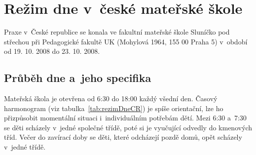 

\section{Režim dne v~české mateřské škole}

		Praxe v~České republice se konala ve fakultní mateřské škole Sluníčko pod střechou při Pedagogické fakultě UK (Mohylová 1964, 155 00 Praha 5) v~období od 19. 10. 2008 do 23. 10. 2008. 

	\subsection{Průběh dne a~jeho specifika}

			Mateřská škola je otevřena od 6:30 do 18:00 každý všední den. Časový harmonogram (viz tabulka~\ref{tab:rezimDneCR})
			je spíše orientační, lze ho přizpůsobit momentální situaci i~individuálním potřebám dětí. Mezi 6:30 a~7:30 se děti scházely v~jedné společné třídě, poté si je vyučující odvedly do kmenových tříd. Večer do zavírací doby se děti, které odcházejí pozdě domů, opět scházely v~jedné třídě.

